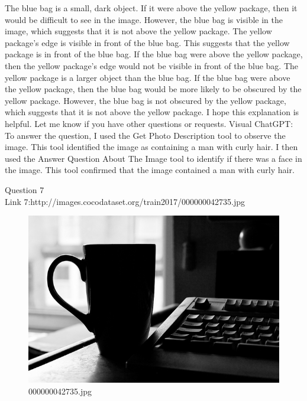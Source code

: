 \begin{enumerate}
        The blue bag is a small, dark object. If it were above the yellow package, then it would be difficult to see in the image. However, the blue bag is visible in the image, which suggests that it is not above the yellow package.
        The yellow package's edge is visible in front of the blue bag. This suggests that the yellow package is in front of the blue bag. If the blue bag were above the yellow package, then the yellow package's edge would not be visible in front of the blue bag.
        The yellow package is a larger object than the blue bag. If the blue bag were above the yellow package, then the blue bag would be more likely to be obscured by the yellow package. However, the blue bag is not obscured by the yellow package, which suggests that it is not above the yellow package.
        I hope this explanation is helpful. Let me know if you have other questions or requests.
        \subitem Visual ChatGPT: To answer the question, I used the Get Photo Description tool to observe the image. This tool identified the image as containing a man with curly hair. I then used the Answer Question About The Image tool to identify if there was a face in the image. This tool confirmed that the image contained a man with curly hair.
    \end{enumerate}
Question 7\\
Link 7:http://images.cocodataset.org/train2017/000000042735.jpg
    \begin{figure}[h]
        \centering
        \includegraphics[width=0.8\linewidth]{../image set/easy/000000042735.jpg}
        \caption{000000042735.jpg}
    \end{figure}
